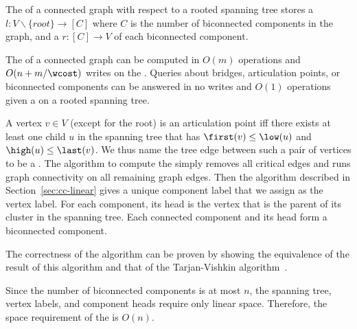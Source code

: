 \begin{definition}[\imprep{}]
  The \imprep{} of a connected graph with respect to a rooted spanning tree
  stores a 
  $l:V\backslash \{\textit{root}\}\to [C]$ where $C$ is the number of
  biconnected components in the graph, and a 
  $r:[C]\to V$ of each biconnected component.
\end{definition}

\begin{lemma}
  The \imprep{} of a connected graph can be computed in $O(m)$ operations
  and $O(n + m/\wcost)$ writes on the \seqmodel. Queries about bridges, articulation
  points, or biconnected components can be answered in no writes and $O(1)$ operations
  given a \imprep{} on a rooted spanning tree.
\end{lemma}


 A vertex $v\in V$ (except for the root) is an articulation point iff there exists at least one child $u$ in the spanning tree that has $\first(v)\le\low(u)$ and $\high(u)\le\last(v)$.
We thus name the tree edge between such a pair of vertices to be a .
The algorithm to compute the \imprep{} simply removes all critical edges and runs graph connectivity on all remaining graph edges.
Then the algorithm described in Section~\ref{sec:cc-linear} gives a unique component label that we assign as the vertex label.
For each component, its head is the vertex that is the parent of its cluster in the spanning tree.
Each connected component and its head form a biconnected component.

The correctness of the algorithm can be proven by showing the
equivalence of the result of this algorithm and that of the
Tarjan-Vishkin algorithm~\cite{tarjan1985efficient}.

Since the number of biconnected components is at most $n$, the spanning
tree, vertex labels, and component heads require only linear space. Therefore,
 the space requirement of the \imprep{} is $O(n)$.


